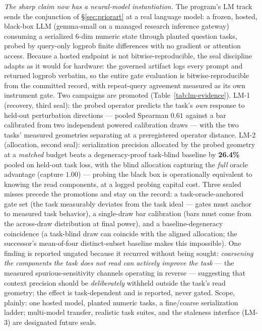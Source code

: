 \documentclass[letterpaper,onecolumn]{IEEEtran}
\theoremstyle{definition}
\theoremstyle{remark}
\begin{document}
\emph{The sharp claim now has a neural-model instantiation.} The
program's LM track sends the conjunction of \S\ref{sec:priorart} at a
real language model: a frozen, hosted, black-box LLM (gemma-small on a
managed research inference gateway) consuming a serialized 6-dim
numeric state through planted question tasks, probed by query-only
logprob finite differences with no gradient or attention access.
Because a hosted endpoint is not bitwise-reproducible, the seal
discipline adapts as it would for hardware: the governed artifact logs
every prompt and returned logprob verbatim, so the entire gate
evaluation is bitwise-reproducible from the committed record, with
repeat-query agreement measured as its own instrument gate. Two
campaigns are promoted (Table~\ref{tab:lm-evidence}). LM-1
(recovery, third seal): the probed operator predicts the task's
\emph{own} response to held-out perturbation directions --- pooled
Spearman $0.61$ against a bar calibrated from two independent powered
calibration draws --- with the two tasks' measured geometries
separating at a preregistered operator distance. LM-2 (allocation,
second seal): serialization precision allocated by the probed
geometry at a \emph{matched} budget beats a degeneracy-proof
task-blind baseline by \textbf{26.4\%} pooled on held-out task
loss, with the blind allocation capturing the \emph{full} oracle
advantage (capture $1.00$) --- probing the black box is operationally
equivalent to knowing the read components, at a logged probing
capital cost. Three sealed misses precede the promotions and stay on
the record: a task-oracle-anchored gate set (the task measurably
deviates from the task ideal --- gates must anchor to measured
task behavior), a single-draw bar calibration (bars must come
from the across-draw distribution at final power), and a
baseline-degeneracy coincidence (a task-blind draw can coincide with
the aligned allocation; the successor's mean-of-four distinct-subset
baseline makes this impossible). One finding is reported ungated
because it recurred without being sought: \emph{coarsening the
components the task does not read can actively improve the
task} --- the measured spurious-sensitivity channels operating in
reverse --- suggesting that context precision should be
\emph{deliberately} withheld outside the task's read geometry;
the effect is task-dependent and is reported, never gated. Scope,
plainly: one hosted model, planted numeric tasks, a fine/coarse
serialization ladder; multi-model transfer, realistic task suites,
and the staleness interface (LM-3) are designated future seals.
\end{document}
